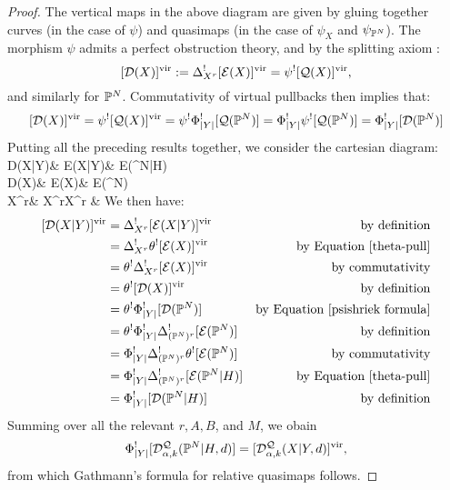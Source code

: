 \begin{proof}
The vertical maps in the above diagram are given by gluing together curves (in the case of $\psi$) and quasimaps (in the case of $\psi_X$ and $\psi_{\mathbb P^N}$). The morphism $\psi$ admits a perfect obstruction theory, and by the splitting axiom \cite[\S 2.3.3]{CF-K-higher-genus}:
\begin{equation*} [\mathcal{D}(X)]^{\mathrm{vir}} := \Delta_{X^r}^! [\mathcal{E}(X)]^{\mathrm{vir}} = \psi^! [\mathcal{Q}(X)]^{\mathrm{vir}}, \end{equation*}
and similarly for $\mathbb P^N$. Commutativity of virtual pullbacks then implies that:
\begin{equation} [\mathcal{D}(X)]^{\mathrm{vir}} = \label{psishriek formula} \psi^![\mathcal{Q}(X)]^{\mathrm{vir}}= \psi^! \Phi_{\lvert Y\rvert}^! [ \mathcal{Q}(\mathbb P^N)] = \Phi_{\lvert Y\rvert}^!\psi^![\mathcal{Q}(\mathbb P^N)] = \Phi_{\lvert Y\rvert}^! [ \mathcal{D}(\mathbb P^N) ]\end{equation}
Putting all the preceding results together, we consider the cartesian diagram:
\bcd
\mathcal D(X|Y)\ar[d]\ar[r] & \mathcal E(X|Y)\ar[d]\ar[r] & \mathcal E(\PP^N|H)\ar[d,"\theta"] \\
\mathcal D(X)\ar[d]\ar[r] & \mathcal E(X)\ar[d]\ar[r] & \mathcal E(\PP^N) \\
X^r\ar[r,"\Delta_{X^r}"] & X^r\times X^r & {}
\ecd
We then have:
\begin{align*} [\mathcal D(X|Y)]^{\mathrm{vir}} & = \Delta_{X^r}^! [\mathcal E(X|Y)]^{\mathrm{vir}} & \text{by definition}\\
& =  \Delta_{X^r}^! \theta^![\mathcal E(X)]^{\mathrm{vir}} & \text{by Equation \eqref{theta-pull}} \\
& =  \theta^!\Delta_{X^r}^! [\mathcal E(X)]^{\mathrm{vir}} & \text{by commutativity} \\
& =  \theta^! [\mathcal{D}(X)]^{\mathrm{vir}} & \text{by definition} \\
& =  \theta^!\Phi_{\lvert Y\rvert}^! [\mathcal{D}(\mathbb P^N)] & \text{by Equation \eqref{psishriek formula}} \\
& =  \theta^!\Phi_{\lvert Y\rvert}^!\Delta_{(\mathbb P^N)^r}^! [\mathcal E(\mathbb P^N)] & \text{by definition} \\
& =  \Phi_{\lvert Y\rvert}^!\Delta_{(\mathbb P^N)^r}^!\theta^! [\mathcal E(\mathbb P^N)] & \text{by commutativity} \\
& = \Phi_{\lvert Y\rvert}^! \Delta_{(\mathbb P^N)^r}^! [\mathcal{E}(\mathbb P^N|H)] & \text{by Equation \eqref{theta-pull}} \\
& =  \Phi_{\lvert Y\rvert}^![\mathcal{D}(\mathbb P^N|H)] & \text{by definition}
\end{align*}
Summing over all the relevant $r, A, B$, and $M$, we obain \[\Phi_{|Y|}^![\mathcal{D}^{\mathcal{Q}}_{\alpha,k}(\mathbb P^N|H,d)]=[\mathcal{D}^{\mathcal{Q}}_{\alpha,k}(X|Y,d)]^{\mathrm{vir}},\] from which Gathmann's formula for relative quasimaps follows. \end{proof}

